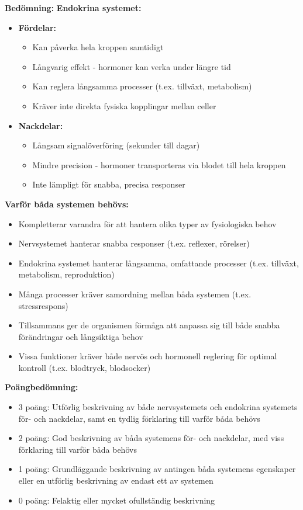 \documentclass{exam}
\newenvironment{answer}
  {\begin{framed}\color{blue}\textbf{Bedömning:} }
  {\end{framed}}
\begin{document}
\begin{questions}
\begin{answer}
\textbf{Endokrina systemet:}
\begin{itemize}
  \item \textbf{Fördelar:}
  \begin{itemize}
    \item Kan påverka hela kroppen samtidigt
    \item Långvarig effekt - hormoner kan verka under längre tid
    \item Kan reglera långsamma processer (t.ex. tillväxt, metabolism)
    \item Kräver inte direkta fysiska kopplingar mellan celler
  \end{itemize}
  
  \item \textbf{Nackdelar:}
  \begin{itemize}
    \item Långsam signalöverföring (sekunder till dagar)
    \item Mindre precision - hormoner transporteras via blodet till hela kroppen
    \item Inte lämpligt för snabba, precisa responser
  \end{itemize}
\end{itemize}

\textbf{Varför båda systemen behövs:}
\begin{itemize}
  \item Kompletterar varandra för att hantera olika typer av fysiologiska behov
  \item Nervsystemet hanterar snabba responser (t.ex. reflexer, rörelser)
  \item Endokrina systemet hanterar långsamma, omfattande processer (t.ex. tillväxt, metabolism, reproduktion)
  \item Många processer kräver samordning mellan båda systemen (t.ex. stressrespons)
  \item Tillsammans ger de organismen förmåga att anpassa sig till både snabba förändringar och långsiktiga behov
  \item Vissa funktioner kräver både nervös och hormonell reglering för optimal kontroll (t.ex. blodtryck, blodsocker)
\end{itemize}

\textbf{Poängbedömning:}
\begin{itemize}
  \item 3 poäng: Utförlig beskrivning av både nervsystemets och endokrina systemets för- och nackdelar, samt en tydlig förklaring till varför båda behövs
  \item 2 poäng: God beskrivning av båda systemens för- och nackdelar, med viss förklaring till varför båda behövs
  \item 1 poäng: Grundläggande beskrivning av antingen båda systemens egenskaper eller en utförlig beskrivning av endast ett av systemen
  \item 0 poäng: Felaktig eller mycket ofullständig beskrivning
\end{itemize}
\end{answer}


\end{questions}
\end{document}
